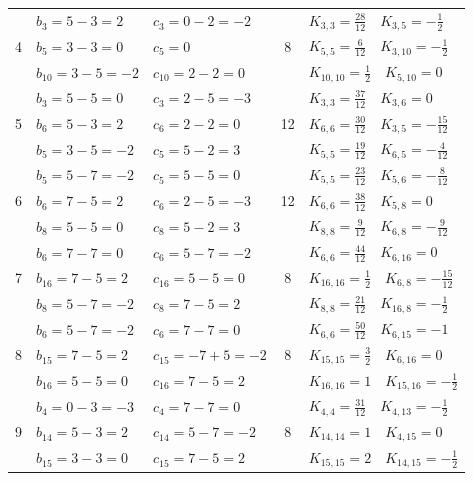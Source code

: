 \documentclass[a4paper, 12pt]{article}
\begin{document}
\begin{longtable}{|c|l|l|c|l|}
\multirow{3}{*}{4} & $b_3=5-3=2$ & $c_3=0-2=-2$ & \multirow{3}{*}{8} & $K_{3,3}=\frac{28}{12} \quad K_{3,5} = -\frac{1}{2}$ \\
 & $b_5=3-3=0$ & $c_5=0$ & & $K_{5,5}=\frac{6}{12} \quad K_{3,10} = -\frac{1}{2}$ \\
 & $b_{10}=3-5=-2$ & $c_{10}=2-2=0$ & & $K_{10,10}=\frac{1}{2} \quad K_{5,10}=0$ \\
\hline

\multirow{3}{*}{5} & $b_3=5-5=0$ & $c_3=2-5=-3$ & \multirow{3}{*}{12} & $K_{3,3}=\frac{37}{12} \quad K_{3,6}=0$ \\
 & $b_6=5-3=2$ & $c_6=2-2=0$ & & $K_{6,6}=\frac{30}{12} \quad K_{3,5} = -\frac{15}{12}$ \\
 & $b_5=3-5=-2$ & $c_5=5-2=3$ & & $K_{5,5}=\frac{19}{12} \quad K_{6,5} = -\frac{4}{12}$ \\
\hline

\multirow{3}{*}{6} & $b_5=5-7=-2$ & $c_5=5-5=0$ & \multirow{3}{*}{12} & $K_{5,5}=\frac{23}{12} \quad K_{5,6} = -\frac{8}{12}$ \\
 & $b_6=7-5=2$ & $c_6=2-5=-3$ & & $K_{6,6}=\frac{38}{12} \quad K_{5,8}=0$ \\
 & $b_8=5-5=0$ & $c_8=5-2=3$ & & $K_{8,8}=\frac{9}{12} \quad K_{6,8} = -\frac{9}{12}$ \\
\hline

\multirow{3}{*}{7} & $b_6=7-7=0$ & $c_6=5-7=-2$ & \multirow{3}{*}{8} & $K_{6,6}=\frac{44}{12} \quad K_{6,16}=0$ \\
 & $b_{16}=7-5=2$ & $c_{16}=5-5=0$ & & $K_{16,16}=\frac{1}{2} \quad K_{6,8} = -\frac{15}{12}$ \\
 & $b_8=5-7=-2$ & $c_8=7-5=2$ & & $K_{8,8}=\frac{21}{12} \quad K_{16,8} = -\frac{1}{2}$ \\
\hline

\multirow{3}{*}{8} & $b_6=5-7=-2$ & $c_6=7-7=0$ & \multirow{3}{*}{8} & $K_{6,6}=\frac{50}{12} \quad K_{6,15} = -1$ \\
 & $b_{15}=7-5=2$ & $c_{15}=-7+5=-2$ & & $K_{15,15}=\frac{3}{2} \quad K_{6,16}=0$ \\
 & $b_{16}=5-5=0$ & $c_{16}=7-5=2$ & & $K_{16,16}=1 \quad K_{15,16} = -\frac{1}{2}$ \\
\hline

\multirow{3}{*}{9} & $b_4=0-3=-3$ & $c_4=7-7=0$ & \multirow{3}{*}{8} & $K_{4,4}=\frac{31}{12} \quad K_{4,13} = -\frac{1}{2}$ \\
 & $b_{14}=5-3=2$ & $c_{14}=5-7=-2$ & & $K_{14,14}=1 \quad K_{4,15}=0$ \\
 & $b_{15}=3-3=0$ & $c_{15}=7-5=2$ & & $K_{15,15}=2 \quad K_{14,15} = -\frac{1}{2}$ \\
\hline


\end{longtable}
\end{document}
